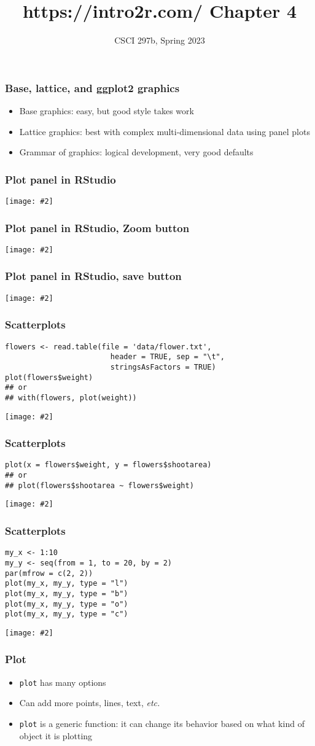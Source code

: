 \documentclass{beamer}
\title{{https://intro2r.com/} Chapter 4}
\author{CSCI 297b, Spring 2023}
\newcommand{\bi}{\begin{itemize}}
\newcommand{\li}{\item}
\newcommand{\ei}{\end{itemize}}
\newcommand{\fig}[2]{\centerline{\texttt{[image: \#2]}}}
\newcommand{\bfr}[1]{\begin{frame}[fragile]\frametitle{{ #1 }}}
\begin{document}
\begin{frame}
\maketitle
\end{frame}

\bfr{Base, lattice, and ggplot2 graphics}

\bi
\li Base graphics:  easy, but good style takes work
\li Lattice graphics:  best with complex multi-dimensional data using panel plots
\li Grammar of graphics:  logical development, very good defaults
\ei
\end{frame}

\bfr{Plot panel in RStudio}
\fig{1}{bg_plots1}
\end{frame}

\bfr{Plot panel in RStudio, Zoom button}
\fig{1}{bg_plots2}
\end{frame}

\bfr{Plot panel in RStudio, save button}
\fig{1}{bg_plots3.png}
\end{frame}

\bfr{Scatterplots}
{\scriptsize
\begin{verbatim}
flowers <- read.table(file = 'data/flower.txt', 
                        header = TRUE, sep = "\t", 
                        stringsAsFactors = TRUE)
plot(flowers$weight)
## or
## with(flowers, plot(weight)) 
\end{verbatim}
}
\fig{.8}{plot1-1}
\end{frame}

\bfr{Scatterplots}
{\scriptsize
\begin{verbatim}
plot(x = flowers$weight, y = flowers$shootarea)
## or
## plot(flowers$shootarea ~ flowers$weight)
\end{verbatim}
}
\fig{.8}{plot4-1.png}
\end{frame}

\bfr{Scatterplots}
{\scriptsize
\begin{verbatim}
my_x <- 1:10
my_y <- seq(from = 1, to = 20, by = 2)
par(mfrow = c(2, 2))
plot(my_x, my_y, type = "l")
plot(my_x, my_y, type = "b")
plot(my_x, my_y, type = "o")
plot(my_x, my_y, type = "c")
\end{verbatim}
}
\fig{.6}{plot6-1.png}
\end{frame}

\bfr{Plot}
\bi
\li {\tt plot} has many options 
\li Can add more points, lines, text, {\em etc.}
\li {\tt plot} is a generic function:  it can change its behavior based
on what kind of object it is plotting
\ei
\end{frame}
\end{document}
